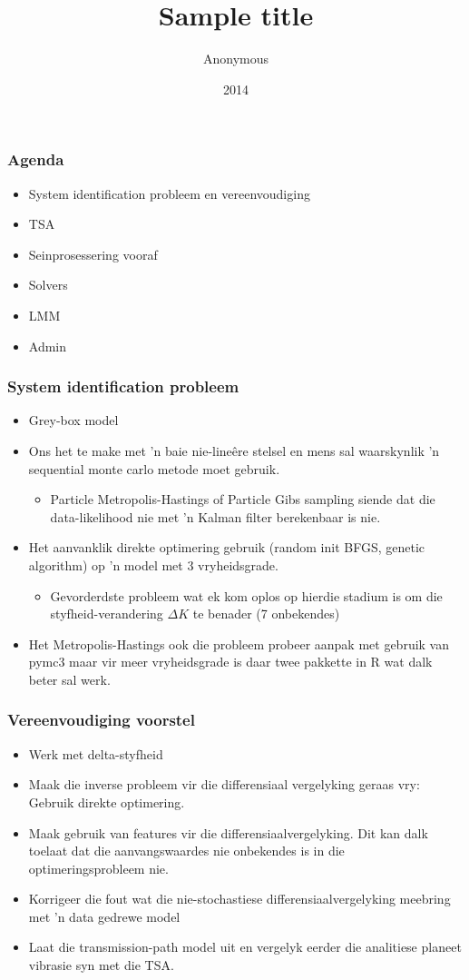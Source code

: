\documentclass{beamer}
\title{Sample title}
\author{Anonymous}
\institute{Overleaf}
\date{2014}
\begin{document}
\begin{frame}
\frametitle{Agenda}
\begin{itemize}
	\item System identification probleem en vereenvoudiging
	\item TSA
	\item Seinprosessering vooraf
	\item Solvers
	\item LMM
	\item Admin
\end{itemize}
\end{frame}

\begin{frame}
\frametitle{System identification probleem}
\begin{itemize}
	\item  Grey-box model
	\item Ons het te make met 'n baie nie-lineêre stelsel en mens sal waarskynlik 'n sequential monte carlo metode moet gebruik. 
	\begin{itemize}
		\item Particle Metropolis-Hastings of Particle Gibs sampling siende dat die data-likelihood nie met 'n Kalman filter berekenbaar is nie. 
	\end{itemize}
	\item Het aanvanklik direkte optimering gebruik (random init BFGS, genetic algorithm) op 'n model met 3 vryheidsgrade. 
	\begin{itemize}
		\item Gevorderdste probleem wat ek kom oplos op hierdie stadium is om die styfheid-verandering $\Delta K$ te benader (7 onbekendes) 
	\end{itemize}
	\item Het Metropolis-Hastings ook die probleem probeer aanpak met gebruik van pymc3 maar vir meer vryheidsgrade is daar twee pakkette in R wat dalk beter sal werk.
\end{itemize}
\end{frame}

\begin{frame}
\frametitle{Vereenvoudiging voorstel}
\begin{itemize}
	\item  Werk met delta-styfheid
	\item  Maak die inverse probleem vir die differensiaal vergelyking geraas vry: Gebruik direkte optimering.
	\item Maak gebruik van features vir die differensiaalvergelyking. Dit kan dalk toelaat dat die aanvangswaardes nie onbekendes is in die optimeringsprobleem nie.
	\item Korrigeer die fout wat die nie-stochastiese differensiaalvergelyking meebring met 'n data gedrewe model
	\item Laat die transmission-path model uit en vergelyk eerder die analitiese planeet vibrasie syn met die TSA. 
\end{itemize}
\end{frame}
\end{document}
